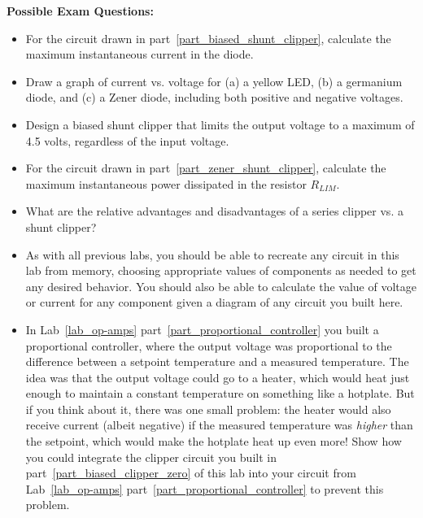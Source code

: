 \textbf{Possible Exam Questions:}

\begin{itemize}

\item For the circuit drawn in part~\ref{part_biased_shunt_clipper}, calculate the maximum instantaneous current in the diode.

\item Draw a graph of current vs. voltage for (a) a yellow LED, (b) a germanium diode, and (c) a Zener diode, including both positive and negative voltages.

\item Design a biased shunt clipper that limits the output voltage to a maximum of 4.5 volts, regardless of the input voltage.

\item For the circuit drawn in part~\ref{part_zener_shunt_clipper}, calculate the maximum instantaneous power dissipated in the resistor $R_{LIM}$. 

\item What are the relative advantages and disadvantages of a series clipper vs. a  shunt clipper?

\item As with all previous labs, you should be able to recreate any circuit in this lab from memory, choosing appropriate values of components as needed to get any desired behavior.  You should also be able to calculate the value of voltage or current for any component given a diagram of any circuit you built here.

\item In Lab~\ref{lab_op-amps} part~\ref{part_proportional_controller} you built a proportional controller, where the output voltage was proportional to the difference between a setpoint temperature and a measured temperature.  The idea was that the output voltage could go to a heater, which would heat just enough to maintain a constant temperature on something like a hotplate.  But if you think about it, there was one small problem: the heater would also receive current (albeit negative) if the measured temperature was \textit{higher} than the setpoint, which would make the hotplate heat up even more!  Show how you could integrate the clipper circuit you built in part~\ref{part_biased_clipper_zero} of this lab into your circuit from Lab~\ref{lab_op-amps} part~\ref{part_proportional_controller} to prevent this problem.


\end{itemize}






